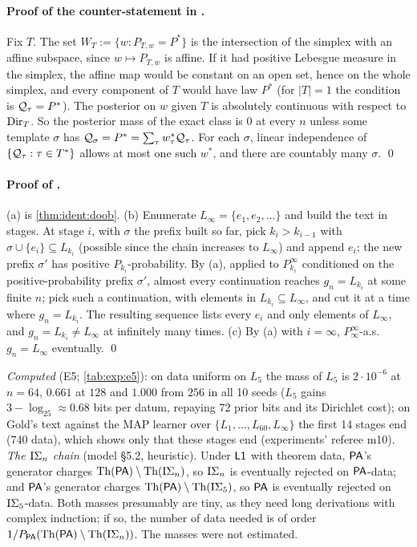 \paragraph{Proof of the counter-statement in .} Fix $T$. The set $W_T:=\{w:P_{T,w}=P^*\}$ is the intersection of the simplex with an affine subspace, since $w\mapsto P_{T,w}$ is affine. If it had positive Lebesgue measure in the simplex, the affine map would be constant on an open set, hence on the whole simplex, and every component of $T$ would have law $P^*$ (for $|T|=1$ the condition is $\mathcal{Q}_\tau=P^*$). The posterior on $w$ given $T$ is absolutely continuous with respect to $\mathrm{Dir}_T$. So the posterior mass of the exact class is $0$ at every $n$ unless some template $\sigma$ has $\mathcal{Q}_\sigma=P^*=\sum_\tau w^*_\tau\mathcal{Q}_\tau$. For each $\sigma$, linear independence of $\{\mathcal{Q}_\tau:\tau\in T^*\}$ allows at most one such $w^*$, and there are countably many $\sigma$. \qed

\paragraph{Proof of .} (a) is \cref{thm:ident:doob}. (b) Enumerate $L_\infty=\{e_1,e_2,\dots\}$ and build the text in stages. At stage $i$, with $\sigma$ the prefix built so far, pick $k_i>k_{i-1}$ with $\sigma\cup\{e_i\}\subseteq L_{k_i}$ (possible since the chain increases to $L_\infty$) and append $e_i$; the new prefix $\sigma'$ has positive $P_{k_i}$-probability. By (a), applied to $P_{k_i}^\infty$ conditioned on the positive-probability prefix $\sigma'$, almost every continuation reaches $g_n=L_{k_i}$ at some finite $n$; pick such a continuation, with elements in $L_{k_i}\subseteq L_\infty$, and cut it at a time where $g_n=L_{k_i}$. The resulting sequence lists every $e_i$ and only elements of $L_\infty$, and $g_n=L_{k_i}\ne L_\infty$ at infinitely many times. (c) By (a) with $i=\infty$, $P_\infty^\infty$-a.s.\ $g_n=L_\infty$ eventually. \qed

\emph{Computed} (E5; \cref{tab:exp:e5}): on data uniform on $L_5$ the mass of $L_5$ is $2\cdot10^{-6}$ at $n=64$, $0.661$ at $128$ and $1.000$ from $256$ in all 10 seeds ($L_5$ gains $3-\log_25\approx0.68$ bits per datum, repaying 72 prior bits and its Dirichlet cost); on Gold's text against the MAP learner over $\{L_1,\dots,L_{60},L_\infty\}$ the first 14 stages end (740 data), which shows only that these stages end (experiments' referee m10).
\emph{The $\mathrm{I}\Sigma_{n}$ chain} (model \S5.2, heuristic). Under $\mathord{\mathsf{L1}}$ with theorem data, $\mathsf{PA}$'s generator charges $\mathrm{Th}(\mathsf{PA})\setminus\mathrm{Th}(\mathrm{I}\Sigma_{n})$, so $\mathrm{I}\Sigma_{n}$ is eventually rejected on $\mathsf{PA}$-data; and $\mathsf{PA}$'s generator charges $\mathrm{Th}(\mathsf{PA})\setminus\mathrm{Th}(\mathrm{I}\Sigma_{5})$, so $\mathsf{PA}$ is eventually rejected on $\mathrm{I}\Sigma_{5}$-data. Both masses presumably are tiny, as they need long derivations with complex induction; if so, the number of data needed is of order $1/P_{\mathsf{PA}}(\mathrm{Th}(\mathsf{PA})\setminus\mathrm{Th}(\mathrm{I}\Sigma_{n}))$. The masses were not estimated.

